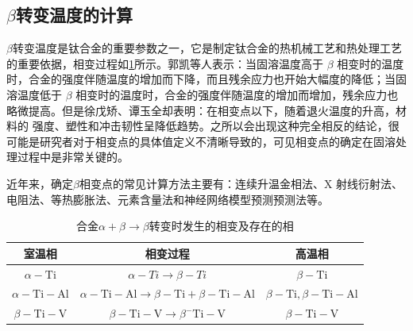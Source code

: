 %

\subsection{$\beta$转变温度的计算}
$\beta$转变温度是钛合金的重要参数之一，它是制定钛合金的热机械工艺和热处理工艺的重要依据，相变过程如\ref{sec:Tc4betachange}所示。郭凯\cite{guokaiTC4taihejinrechuligongyideyanjiuxianzhuangjijinzhan2021}等人表示：当固溶温度高于 $\beta$ 相变时的温度时，合金的强度伴随温度的增加而下降，而且残余应力也开始大幅度的降低；当固溶温度低于 $\beta$ 相变时的温度时，合金的强度伴随温度的增加而增加，残余应力也略微提高。但是徐戊矫、谭玉全\cite{xujianGurongshixiaogongyiduiTC4taihejinzuzhijixingnengdeyingxiang2014}却表明：在相变点以下，随着退火温度的升高，材料的 强度、塑性和冲击韧性呈降低趋势。之所以会出现这种完全相反的结论，很可能是研究者对于相变点的具体值定义不清晰导致的，可见相变点的确定在固溶处理过程中是非常关键的。

近年来，确定$ \beta $相变点的常见计算方法\cite{zhuhongTaihejinaVxiangbiandiandejizhongceshifangfatantao2013}主要有：连续升温金相法、X 射线衍射法、电阻法、等热膨胀法、元素含量法和神经网络模型预测预测法\cite{renchiqiangGurongshixiaoduiTC4taihejinxianweizuzhihelixuexingnengdeyingxiang2022}等。
\begin{table}[htbp]
	\centering
	\caption{\ti 合金$ \alpha+\beta \to \beta $转变时发生的相变及存在的相}
	\label{sec:Tc4betachange}
	\begin{tabular}{ccc}
		\toprule 室温相 & 相变过程 & 高温相 \\
		\midrule$\alpha-\mathrm{Ti}$ & $\alpha-T i \rightarrow \beta-T i$ & $\beta-\mathrm{Ti}$ \\
		$\alpha-\mathrm{Ti}-\mathrm{Al}$ & $\alpha-\mathrm{Ti}-\mathrm{Al} \rightarrow \beta-\mathrm{Ti}+\beta-\mathrm{Ti}-\mathrm{Al}$ & $\beta-\mathrm{Ti}, \beta-\mathrm{Ti}-\mathrm{Al}$ \\
		$\beta- \mathrm{Ti}-\mathrm{V}$ & $\beta-\mathrm{Ti}-\mathrm{V} \rightarrow \beta^{-} \mathrm{Ti}-\mathrm{V}$ & $\beta-\mathrm{Ti}-\mathrm{V}$ \\
		\bottomrule
	\end{tabular}
\end{table}

